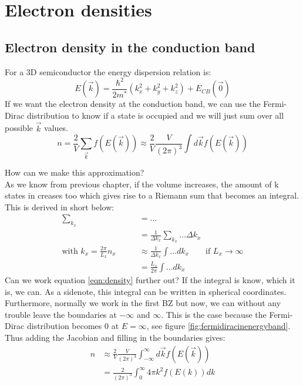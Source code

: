 \section{Electron densities}
\subsection{Electron density in the conduction band} \label{sec:electron_density}
For a 3D semiconductor the energy dispersion relation is:
\begin{equation}
	E(\vec{k}) = \frac{\hbar^2}{2m^*}(k^2_x + k^2_y + k^2_z) + E_{CB}(\vec{0})
\end{equation}
If we want the electron density at the conduction band, we can use the Fermi-Dirac distribution to know if a state is occupied and we will just sum over all possible $\vec{k}$ values.
\begin{equation}
	n = \frac{2}{V}\sum_{\vec{k}}^{}f(E(\vec{k})) \approx \frac{2}{V}\frac{V}{(2\pi)^3}\int d\vec{k} f(E(\vec{k})) \label{eqn:density}
\end{equation} \par
How can we make this approximation? \\
As we know from previous chapter, if the volume increases, the amount of k states in creases too which gives rise to a Riemann sum that becomes an integral. This is derived in short below:
\begin{align}
	\sum_{k_x} &= \dots \\
	&= \frac{1}{\Delta k_x}\sum_{k_x}\dots \Delta k_x \\
	\text{with }k_x = \frac{2\pi}{L_x}n_x \qquad &\approx \frac{1}{\Delta k_x}\int\dots dk_x \qquad \text{if }L_x \rightarrow \infty \\
	&= \frac{L_x}{2\pi}\int\dots dk_x
\end{align}
Can we work equation \ref{eqn:density} further out? If the integral is know, which it is, we can. As a sidenote, this integral can be written in spherical coordinates.
Furthermore, normally we work in the first BZ but now, we can without any trouble leave the boundaries at $-\infty$ and $\infty$. This is the case because the Fermi-Dirac distribution becomes 0 at $E = \infty$, see figure \ref{fig:fermidiracinenergyband}. Thus adding the Jacobian and filling in the boundaries gives:
\begin{align}
	n &\approx \frac{2}{V}\frac{V}{(2\pi)^3}\int_{-\infty}^{\infty} d\vec{k} f(E(\vec{k})) \\
	&= \frac{2}{(2\pi)^3}\int_{0}^{\infty}4\pi k^2 f(E(k)) dk
\end{align}
